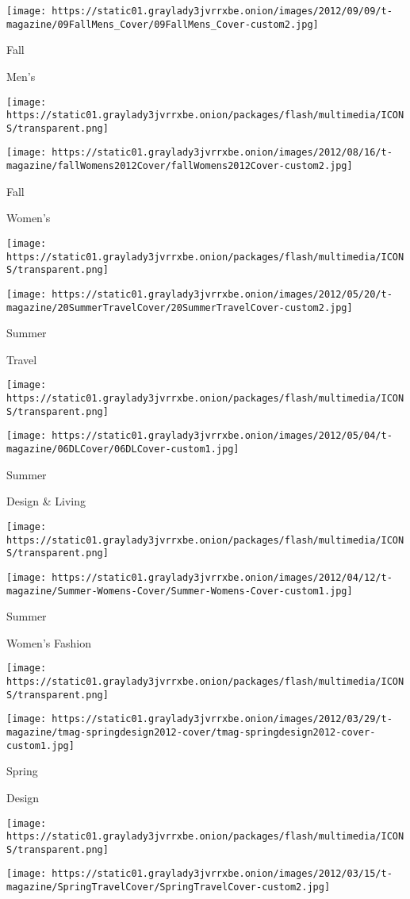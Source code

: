 \texttt{[image: https://static01.graylady3jvrrxbe.onion/images/2012/09/09/t-magazine/09FallMens\_Cover/09FallMens\_Cover-custom2.jpg]}

Fall

Men's

\texttt{[image: https://static01.graylady3jvrrxbe.onion/packages/flash/multimedia/ICONS/transparent.png]}

\texttt{[image: https://static01.graylady3jvrrxbe.onion/images/2012/08/16/t-magazine/fallWomens2012Cover/fallWomens2012Cover-custom2.jpg]}

Fall

Women's

\texttt{[image: https://static01.graylady3jvrrxbe.onion/packages/flash/multimedia/ICONS/transparent.png]}

\texttt{[image: https://static01.graylady3jvrrxbe.onion/images/2012/05/20/t-magazine/20SummerTravelCover/20SummerTravelCover-custom2.jpg]}

Summer

Travel

\texttt{[image: https://static01.graylady3jvrrxbe.onion/packages/flash/multimedia/ICONS/transparent.png]}

\texttt{[image: https://static01.graylady3jvrrxbe.onion/images/2012/05/04/t-magazine/06DLCover/06DLCover-custom1.jpg]}

Summer

Design \& Living

\texttt{[image: https://static01.graylady3jvrrxbe.onion/packages/flash/multimedia/ICONS/transparent.png]}

\texttt{[image: https://static01.graylady3jvrrxbe.onion/images/2012/04/12/t-magazine/Summer-Womens-Cover/Summer-Womens-Cover-custom1.jpg]}

Summer

Women's Fashion

\texttt{[image: https://static01.graylady3jvrrxbe.onion/packages/flash/multimedia/ICONS/transparent.png]}

\texttt{[image: https://static01.graylady3jvrrxbe.onion/images/2012/03/29/t-magazine/tmag-springdesign2012-cover/tmag-springdesign2012-cover-custom1.jpg]}

Spring

Design

\texttt{[image: https://static01.graylady3jvrrxbe.onion/packages/flash/multimedia/ICONS/transparent.png]}

\texttt{[image: https://static01.graylady3jvrrxbe.onion/images/2012/03/15/t-magazine/SpringTravelCover/SpringTravelCover-custom2.jpg]}

